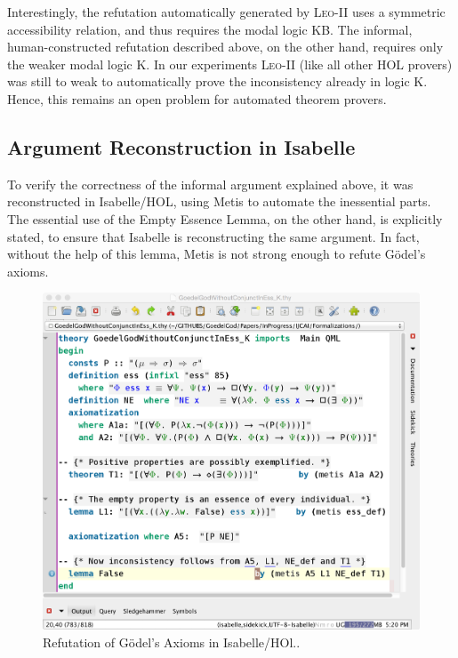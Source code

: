 \documentclass{article}
\begin{document}
Interestingly, the refutation automatically generated by
\textsc{Leo-II} uses a symmetric accessibility relation, and thus
requires the modal logic KB. The informal, human-constructed
refutation described above, on the other hand, requires only the
weaker modal logic K. In our experiments \textsc{Leo-II} (like all
other HOL provers) was still to weak to automatically prove the
inconsistency already in logic K. Hence, this remains an open problem for automated
theorem provers.


\subsection{Argument Reconstruction in Isabelle}

To verify the correctness of the informal argument explained above, it was reconstructed in Isabelle/HOL, using Metis to automate the inessential parts. The essential use of the Empty Essence Lemma, on the other hand, is explicitly stated, to ensure that Isabelle is reconstructing the same argument. In fact, without the help of this lemma, Metis is not strong enough to refute G\"odel's axioms. 
\begin{figure}[t]
\centerline{\includegraphics[width=\columnwidth]{./Images/InconsistencyIsabelleK.png}}
\caption{Refutation of G\"odel's Axioms in Isabelle/HOl..} \label{InconsistencyIsabelleK}
\end{figure}
\end{document}
